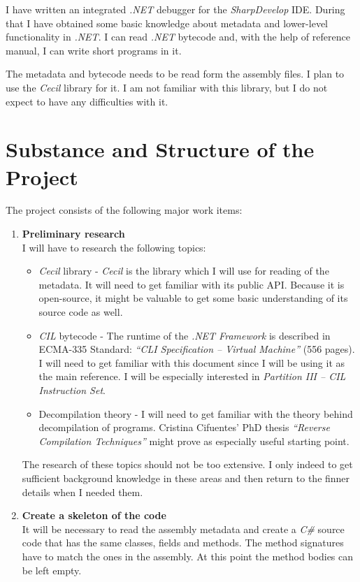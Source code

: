 \documentclass[12pt]{article}
\begin{document}
I have written an integrated \emph{.NET} debugger for the 
\emph{SharpDevelop} IDE.  During that I have obtained some basic knowledge 
about metadata and lower-level functionality in \emph{.NET}.  I can read 
\emph{.NET} bytecode and, with the help of reference manual, I can write 
short programs in it.

The metadata and bytecode needs to be read form the assembly files. 
I plan to use the \emph{Cecil} library for it.  I am not familiar with this 
library, but I do not expect to have any difficulties with it.

\section*{Substance and Structure of the Project}
The project consists of the following major work items:
\begin{enumerate}
\newcommand{\milestone}[1]{\item \textbf{#1} \\}

\milestone{Preliminary research}
I will have to research the following topics:
\begin{itemize}
	\item {\emph{Cecil} library}
		- \emph{Cecil} is the library which I will use for reading of the 
		metadata.  It will need to get familiar with its public API.
		Because it is open-source, it might be valuable to get some basic 
		understanding of its source code as well.
	\item {\emph{CIL} bytecode}
		- The runtime of the \emph{.NET Framework} is described in 
		ECMA-335 Standard: \emph{``CLI Specification -- Virtual Machine''} 
		(556 pages).  I will need to get familiar with this document since 
		I will be using it as the main reference.  I will be especially 
		interested in \emph{Partition III -- CIL Instruction Set}.
	\item {Decompilation theory} - I will need to get familiar with the 
		theory behind decompilation of programs.  Cristina Cifuentes' 
		PhD thesis \emph{``Reverse Compilation Techniques''} might prove as 
		especially useful starting point.
\end{itemize}

The research of these topics should not be too extensive.  I only indeed to 
get sufficient background knowledge in these areas and then return to the 
finner details when I needed them.

\milestone{Create a skeleton of the code}
It will be necessary to read the assembly metadata and create a \emph{C\#} 
source code that has the same classes, fields and methods.  The method 
signatures have to match the ones in the assembly.  At this point the method 
bodies can be left empty.


\end{enumerate}
\end{document}
